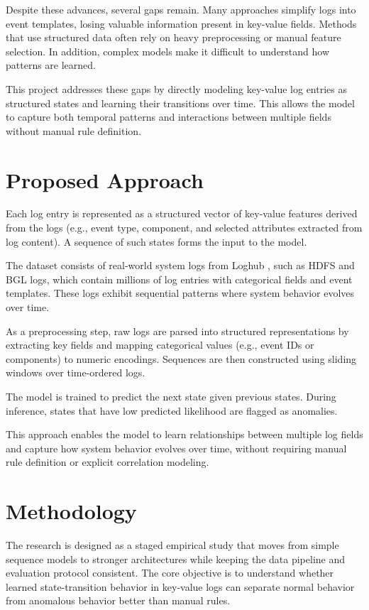 \documentclass[12pt]{article}
\begin{document}
Despite these advances, several gaps remain. Many approaches simplify logs into event templates, losing valuable information present in key-value fields. Methods that use structured data often rely on heavy preprocessing or manual feature selection. In addition, complex models make it difficult to understand how patterns are learned.

This project addresses these gaps by directly modeling key-value log entries as structured states and learning their transitions over time. This allows the model to capture both temporal patterns and interactions between multiple fields without manual rule definition.

\section{Proposed Approach}

Each log entry is represented as a structured vector of key-value features derived from the logs (e.g., event type, component, and selected attributes extracted from log content). A sequence of such states forms the input to the model.

The dataset consists of real-world system logs from Loghub \cite{loghub}, such as HDFS and BGL logs, which contain millions of log entries with categorical fields and event templates. These logs exhibit sequential patterns where system behavior evolves over time.

As a preprocessing step, raw logs are parsed into structured representations by extracting key fields and mapping categorical values (e.g., event IDs or components) to numeric encodings. Sequences are then constructed using sliding windows over time-ordered logs.

The model is trained to predict the next state given previous states. During inference, states that have low predicted likelihood are flagged as anomalies.

This approach enables the model to learn relationships between multiple log fields and capture how system behavior evolves over time, without requiring manual rule definition or explicit correlation modeling.

\section{Methodology}

The research is designed as a staged empirical study that moves from simple sequence models to stronger architectures while keeping the data pipeline and evaluation protocol consistent. The core objective is to understand whether learned state-transition behavior in key-value logs can separate normal behavior from anomalous behavior better than manual rules.
\end{document}
